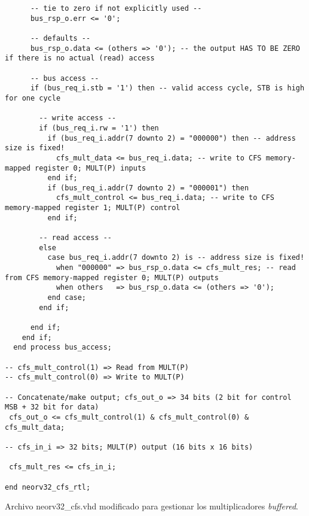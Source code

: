 \begin{code}
\begin{verbatim}
      -- tie to zero if not explicitly used --
      bus_rsp_o.err <= '0';

      -- defaults --
      bus_rsp_o.data <= (others => '0'); -- the output HAS TO BE ZERO if there is no actual (read) access

      -- bus access --
      if (bus_req_i.stb = '1') then -- valid access cycle, STB is high for one cycle

        -- write access --
        if (bus_req_i.rw = '1') then
          if (bus_req_i.addr(7 downto 2) = "000000") then -- address size is fixed!
            cfs_mult_data <= bus_req_i.data; -- write to CFS memory-mapped register 0; MULT(P) inputs
          end if;
          if (bus_req_i.addr(7 downto 2) = "000001") then
            cfs_mult_control <= bus_req_i.data; -- write to CFS memory-mapped register 1; MULT(P) control
          end if;

        -- read access --
        else
          case bus_req_i.addr(7 downto 2) is -- address size is fixed!
            when "000000" => bus_rsp_o.data <= cfs_mult_res; -- read from CFS memory-mapped register 0; MULT(P) outputs
            when others   => bus_rsp_o.data <= (others => '0');
          end case;
        end if;

      end if;
    end if;
  end process bus_access;

-- cfs_mult_control(1) => Read from MULT(P)
-- cfs_mult_control(0) => Write to MULT(P)

-- Concatenate/make output; cfs_out_o => 34 bits (2 bit for control MSB + 32 bit for data)
 cfs_out_o <= cfs_mult_control(1) & cfs_mult_control(0) & cfs_mult_data; 

-- cfs_in_i => 32 bits; MULT(P) output (16 bits x 16 bits)

 cfs_mult_res <= cfs_in_i;

end neorv32_cfs_rtl;
\end{verbatim}
\caption{Archivo neorv32\_cfs.vhd modificado para gestionar los multiplicadores \textit{buffered}.}
\label{ap-cod:17}
\end{code}

